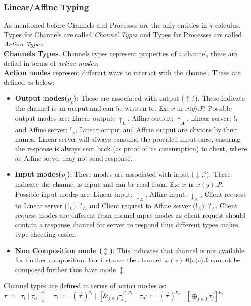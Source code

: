 \documentclass[11pt, pdftex]{article}
\begin{document}
\subsubsection{Linear/Affine Typing} As mentioned before Channels and Processes are the only entities in $\pi$-calculus. Types for Channels are called \textit{Channel Types} and Types for Processes are called \textit{Action Types}.\\
\textbf{Channels Types.} Channels types represent properties of a channel, these are defied in terms of \textit{action modes}.\\
\textbf{Action modes} represent different ways to interact with the channel. These are defined as below:
\begin{itemize}
\item \textbf{Output modes($p_{o}$)}: These are associated with output ($\uparrow$,$!$). These indicate the channel is an output and can be written to. Ex: $x$ in $\overline{x}\langle y \rangle.P$. Possible output modes are: Linear output: $\uparrow_{L}$, Affine output: $\uparrow_{A}$, Linear server: $!_{L}$ and Affine server: $!_{A}$. Linear output and Affine output are obvious by their names. Linear server will always consume the provided input once, ensuring the response is always sent back (as proof of its consumption) to client, where as Affine server may not send response.
\item \textbf{Input modes($p_{i}$)}: These modes are associated with input ($\downarrow$,$?$). These indicate the channel is input and can be read from. Ex: $x$ in $x(y).P$. Possible input modes are: Linear input: $\downarrow_{L}$, Affine input: $\downarrow_{A}$, Client request to Linear server ($!_{L}$): $?_{L}$ and  Client request to Affine server ($!_{A})$: $?_{A}$. Client request modes are different from normal input modes as client request should contain a response channel for server to respond thus different types makes type checking easier.
\item \textbf{Non Composition mode ($\updownarrow$)}: This indicates that channel is not available for further composition. For instance the channel: $x(v).0|x\langle v \rangle.0$ cannot be composed further thus have mode $\updownarrow$
\end{itemize}
Channel types are defined in terms of action modes as:\\
$\tau ::= \tau_{i} \mid \tau_{o} \mid \updownarrow \quad \tau_{i} ::= (\overrightarrow{\tau})^{p_{i}} \mid [\&_{j \in I} \overrightarrow{\tau_{j}}]^{p_{i}} \quad \tau_{o} ::= (\overrightarrow{\tau})^{p_{o}} \mid [\oplus_{j \in I} \overrightarrow{\tau_{j}}]^{p_{o}}$\\
\end{document}
